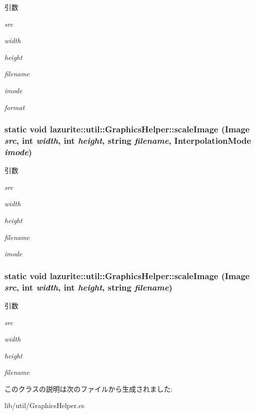 \begin{DoxyParams}{引数}
\item[{\em src}]\item[{\em width}]\item[{\em height}]\item[{\em filename}]\item[{\em imode}]\item[{\em format}]\end{DoxyParams}
\hypertarget{classlazurite_1_1util_1_1_graphics_helper_ae717350422eda3c2ca29c44fbe008d2d}{
\subsubsection[{scaleImage}]{\setlength{\rightskip}{0pt plus 5cm}static void lazurite::util::GraphicsHelper::scaleImage (Image {\em src}, \/  int {\em width}, \/  int {\em height}, \/  string {\em filename}, \/  InterpolationMode {\em imode})}}
\label{classlazurite_1_1util_1_1_graphics_helper_ae717350422eda3c2ca29c44fbe008d2d}

\begin{DoxyParams}{引数}
\item[{\em src}]\item[{\em width}]\item[{\em height}]\item[{\em filename}]\item[{\em imode}]\end{DoxyParams}
\hypertarget{classlazurite_1_1util_1_1_graphics_helper_ae81d97bf1fcc237baad9795b6b97f478}{
\subsubsection[{scaleImage}]{\setlength{\rightskip}{0pt plus 5cm}static void lazurite::util::GraphicsHelper::scaleImage (Image {\em src}, \/  int {\em width}, \/  int {\em height}, \/  string {\em filename})}}
\label{classlazurite_1_1util_1_1_graphics_helper_ae81d97bf1fcc237baad9795b6b97f478}

\begin{DoxyParams}{引数}
\item[{\em src}]\item[{\em width}]\item[{\em height}]\item[{\em filename}]\end{DoxyParams}


このクラスの説明は次のファイルから生成されました:\begin{DoxyCompactItemize}
\item 
lib/util/GraphicsHelper.cs\end{DoxyCompactItemize}
